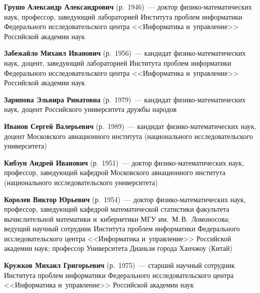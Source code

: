 \begin{multicols}{2}
\noindent
\textbf{Грушо Александр Александрович} (р.\ 1946)~--- доктор 
фи\-зи\-ко-ма\-те\-ма\-ти\-че\-ских наук, профессор, заведующий лабораторией 
Института проб\-лем информатики Федерального исследовательского центра 
<<Информатика и~управ\-ле\-ние>> Российской академии наук 

\vspace*{3pt}

\noindent
\textbf{Забежайло Михаил Иванович} (р.\ 1956)~--- 
кандидат фи\-зи\-ко-ма\-те\-ма\-ти\-че\-ских наук, доцент, заведующий лабораторией 
Института проб\-лем информатики Федерального исследовательского центра 
<<Информатика и~управ\-ле\-ние>> Российской академии наук 

\columnbreak

\noindent
\textbf{Зарипова Эльвира Ринатовна} (р.\ 1979)~--- 
кандидат фи\-зи\-ко-ма\-те\-ма\-ти\-че\-ских наук, доцент Российского университета 
дружбы народов

\vspace*{3pt}

\noindent
\textbf{Иванов Сергей Валерьевич} (р.\ 1989)~--- 
кандидат фи\-зи\-ко-ма\-те\-ма\-ти\-че\-ских наук, доцент Московского 
авиационного института (национального исследовательского университета)

\vspace*{3pt}

\noindent
\textbf{Кибзун Андрей Иванович}  (р.\ 1951)~--- 
доктор фи\-зи\-ко-ма\-те\-ма\-ти\-че\-ских наук, профессор, 
заведующий кафедрой Московского авиационного института 
(национального исследовательского университета)

\vspace*{3pt}

\noindent
\textbf{Королев Виктор Юрьевич} (р.\ 1954)~--- доктор 
фи\-зи\-ко-ма\-те\-ма\-ти\-че\-ских наук, профессор, 
заведующий кафедрой математической статистики факультета вычислительной 
математики и~кибернетики МГУ им.\ М.\,В.~Ломоносова; 
ведущий научный сотрудник Института проб\-лем информатики 
Федерального исследовательского центра <<Информатика и~управ\-ле\-ние>> 
Российской академии наук; профессор Университета Дианьзи города Ханчжоу (Китай)

\vspace*{3pt}


\noindent
\textbf{Кружков Михаил Григорьевич} (р.\ 1975)~--- 
старший научный сотрудник Института проб\-лем 
информатики Федерального исследовательского центра 
<<Информатика и~управ\-ле\-ние>> Российской академии наук


\end{multicols}

